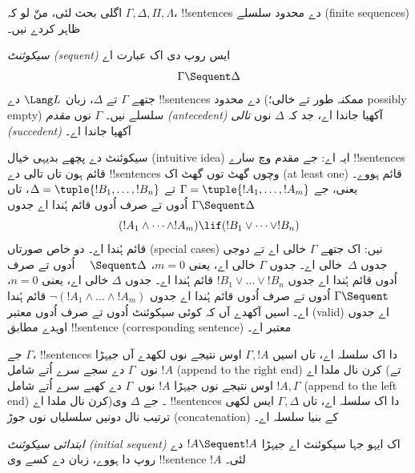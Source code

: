 \documentclass[../../../include/open-logic-section]{subfiles}
\begin{document}
      {}
      {}


اگلی بحث لئی، منّ لو کہ $\Gamma, \Delta, \Pi, \Lambda$، !!{sentence}s
دے محدود سلسلے (finite sequences) ظاہر کردے نیں۔

\begin{defn}
\emph{سیکوئنٹ (sequent)} ایس روپ دی اک عبارت اے
\[
\Gamma \Sequent \Delta
\]
جتھے $\Gamma$ تے $\Delta$، زبان $\Lang L$ دے !!{sentence}s دے محدود
(ممکنہ طور تے خالی؛ possibly empty) سلسلے نیں۔ $\Gamma$ نوں
\emph{مقدم (antecedent)} آکھیا جاندا اے، جد کہ $\Delta$ نوں
\emph{تالی (succedent)} آکھیا جاندا اے۔
\end{defn}

\begin{explain}
سیکوئنٹ دے پچھے بدیہی خیال (intuitive idea) ایہ اے: جے مقدم وچ سارے
!!{sentence}s قائم ہون تاں تالی دے !!{sentence}s وچوں گھٹ توں گھٹ اک
(at least one) قائم ہووے۔ یعنی، جے
$\Gamma = \tuple{!A_1, \dots, !A_m}$ تے
$\Delta = \tuple{!B_1, \dots, !B_n}$، تاں $\Gamma \Sequent \Delta$
اُدوں تے صرف اُدوں قائم ہُندا اے جدوں
\[
(!A_1 \land \cdots \land !A_m) \lif (!B_1 \lor \cdots \lor
!B_n)
\]
قائم ہُندا اے۔ دو خاص صورتاں (special cases) نیں: اک جتھے $\Gamma$ خالی اے تے دوجی
جدوں $\Delta$~خالی اے۔ جدوں $\Gamma$ خالی اے، یعنی $m = 0$، $\quad
\Sequent \Delta$ اُدوں تے صرف اُدوں قائم ہُندا اے جدوں $!B_1 \lor
\dots \lor !B_n$ قائم ہُندا اے۔ جدوں $\Delta$ خالی اے، یعنی $n = 0$،
$\Gamma \Sequent \quad$ اُدوں تے صرف اُدوں قائم ہُندا اے جدوں
$\lnot(!A_1 \land \dots \land !A_m)$ قائم ہُندا اے۔ اسیں آکھدے آں
کہ کوئی سیکوئنٹ اُدوں تے صرف اُدوں معتبر (valid) اے جدوں اوہدے مطابق
!!{sentence} (corresponding sentence) معتبر اے۔
\end{explain}

جے $\Gamma$، !!{sentence}s دا اک سلسلہ اے، تاں اسیں $\Gamma, !A$ اوس
نتیجے نوں لکھدے آں جیہڑا $!A$ نوں~$\Gamma$ دے سجے سرے اُتے شامل
(append to the right end) کرن
نال ملدا اے (تے $!A, \Gamma$ اوس نتیجے نوں جیہڑا $!A$ نوں~$\Gamma$
دے کھبے سرے اُتے شامل (append to the left end) کرن نال ملدا اے)۔ جے $\Delta$ وی
!!{sentence}s دا اک سلسلہ اے، تاں $\Gamma, \Delta$ ایس لکھی ترتیب نال
دونیں سلسلیاں نوں جوڑ (concatenation) کے بنیا سلسلہ اے۔

\begin{defn}
\emph{ابتدائی سیکوئنٹ (initial sequent)} اک ایہو جہا سیکوئنٹ اے
{جیہڑا $!A \Sequent !A$ دے روپ دا ہووے}، زبان دے کسے وی
!!{sentence} $!A$ لئی۔
\end{defn}
\end{document}
